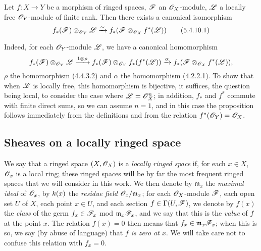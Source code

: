 \begin{env}[5.4.10]
\label{env-0.5.4.10}
Let $f:X\to Y$ be a morphism of ringed spaces, $\mathscr{F}$ an $\mathscr{O}_X$-module,
$\mathscr{L}$ a locally free $\mathscr{O}_Y$-module of finite rank. Then there exists a
canonical isomorphism
\[
  f_*(\mathscr{F})\otimes_{\mathscr{O}_Y}\mathscr{L}\xrightarrow{\sim} f_*(\mathscr{F}\otimes_{\mathscr{O}_X}f^*(\mathscr{L}))
  \tag{5.4.10.1}
\]

Indeed, for each $\mathscr{O}_Y$-module $\mathscr{L}$, we have a canonical homomorphism
\[
  f_*(\mathscr{F})\otimes_{\mathscr{O}_Y}\mathscr{L}
  \xrightarrow{1\otimes\rho}f_*(\mathscr{F})\otimes_{\mathscr{O}_Y}f_*(f^*(\mathscr{L}))
  \xrightarrow{\alpha}f_*(\mathscr{F}\otimes_{\mathscr{O}_X}f^*(\mathscr{L})),
\]
$\rho$ the homomorphism (4.4.3.2) and $\alpha$ the homomorphism (4.2.2.1). To
show that when $\mathscr{L}$ is locally free, this homomorphism is bijective, it
suffices, the question being local, to consider the case where $\mathscr{L}=\mathscr{O}_X^n$;
in addition, $f_*$ and $f^*$ commute with finite direct sums, so we can assume
$n=1$, and in this case the proposition follows immediately from the definitions
and from the relation $f^*(\mathscr{O}_Y)=\mathscr{O}_X$.
\end{env}

\subsection{Sheaves on a locally ringed space}
\label{subsection-sheaves-on-lrs}

\begin{env}[5.5.1]
\label{env-0.5.5.1}
We say that a ringed space $(X,\mathscr{O}_X)$ is a {\em locally ringed space} if, for
each $x\in X$, $\mathscr{O}_x$ is a local ring; these ringed spaces will be by far the
most frequent ringed spaces that we will consider in this work. We then denote
by $\mathfrak{m}_x$ the {\em maximal ideal} of $\mathscr{O}_x$, by $k(x)$ the
{\em residue field $\mathscr{O}_x/\mathfrak{m}_x$}; for each $\mathscr{O}_X$-module $\mathscr{F}$,
each open set $U$ of $X$, each point $x\in U$, and each section
$f\in\Gamma(U,\mathscr{F})$, we denote by $f(x)$ the {\em class} of the germ
$f_x\in\mathscr{F}_x$ mod $\mathfrak{m}_x\mathscr{F}_x$, and we say that this is the
{\em value} of $f$ at the point $x$. The relation $f(x)=0$ then means that
$f_x\in\mathfrak{m}_x\mathscr{F}_x$; when this is so, we say (by abuse of language)
that {\em $f$ is zero at $x$}. We will take care not to confuse this relation
with $f_x=0$.
\end{env}

